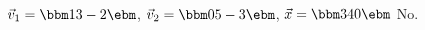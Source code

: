 {$\vec{v}_1 = \bbm 1\\3\\-2\ebm$, $\vec{v}_2 = \bbm 0\\5\\-3\ebm$, $\vec{x} = \bbm 3\\4\\0\ebm$}
{No.}